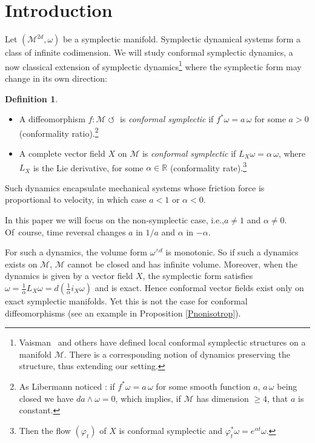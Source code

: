 \documentclass[11pt]{article}
\newcommand{\ie}{i.e.,\xspace}
\newcommand{\skpt}{\smallskip}
\numberwithin{equation}{section}
\numberwithin{figure}{section}
\numberwithin{table}{section}
\providecommand{\righttoleftarrow}{\mathrel{\circlearrowleft}}
\theoremstyle{definition}
\newtheorem{definition}[theorem]{Definition}
\def\R{\mathbb{R}}
\def\cM{{\mathcal M}}
\begin{document}
\section{Introduction} \label{SecShortIntro}

Let $(\cM^{2d}, \omega)$ be a symplectic manifold. Symplectic dynamical systems form a class of infinite codimension. We will study conformal symplectic dynamics, a now classical extension of symplectic dynamics\footnote{Vaisman~\cite{Vaisman1985} and others have defined local conformal symplectic structures on a manifold $\cM$. There is a corresponding notion of dynamics preserving the structure, thus extending our setting.} where the symplectic form may change in its own direction:

\skpt
\begin{definition}
\begin{itemize}
\item A diffeomorphism $f: \cM \righttoleftarrow$ is \emph{conformal symplectic} if $f^*\omega=a\, \omega$ for some $a>0$ (conformality ratio).\footnote{As Libermann noticed \cite{Lib1959}: if $f^*\omega=a\, \omega$ for some smooth function $a$, $a\,\omega$ being closed we have $da \wedge \omega = 0$, which implies, if $\cM$ has dimension $\geq 4$, that $a$ is constant.}
\item A complete vector field $X$ on $\cM$ is \emph{conformal symplectic} if $L_X\omega=\alpha\, \omega$, where $L_X$ is the Lie derivative, for some $\alpha \in \R$ (conformality rate).\footnote{Then the flow $(\varphi_t)$ of $X$ is conformal symplectic and $\varphi_t^*\omega=e^{\alpha t}\omega$.}
\end{itemize}
\end{definition}

Such dynamics encapsulate mechanical systems whose friction force is proportional to velocity, in which case $a<1$ or $\alpha<0$.

In this paper we will focus on the non-symplectic case, \ie $a \neq 1$ and $\alpha \neq 0$. Of~course, time reversal changes $a$ in $1/a$ and $\alpha$ in $-\alpha$.

For such a dynamics, the volume form $\omega^{\wedge d}$ is monotonic. So if such a dynamics exists on $\cM$, $\cM$ cannot be closed and has infinite volume. Moreover, when the dynamics is given by a vector field $X$, the symplectic form satisfies $\omega=\frac{1}{\alpha} L_X\omega= d\left(\frac{1}{\alpha}i_X\omega\right)$ and is exact. Hence conformal vector fields exist only on exact symplectic manifolds. Yet this is not the case for conformal diffeomorphisms (see an example in Proposition \ref{Pnonisotrop}).
\end{document}
